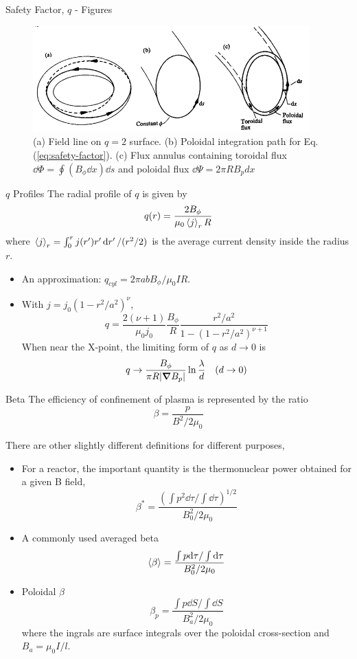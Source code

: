 \begin{frame} {Safety Factor, $q$ - Figures}
  \begin{figure}
    \centering
    \includegraphics[width=0.95\textwidth]{figures/safety-factor.png}
    \caption{(a) Field line on $q=2$ surface. (b) Poloidal integration path for Eq.(\ref{eq:safety-factor}). (c) Flux annulus containing toroidal flux $\dd{\Phi}=\oint (B_\phi\dd{x})\dd{s}$ and poloidal flux $\dd{\Psi}=2\pi RB_p dx$}
    \label{fig:safety-factor}
  \end{figure}
\end{frame}

\begin{frame} {$q$ Profiles}
  The radial profile of $q$ is given by
  \begin{equation}
    q(r) = \frac{2B_\phi}{\mu_0\expval{j}_r R}
    \label{eq:radial-q-profile}
  \end{equation}
  where $\expval{j}_r = \int_0^rj(r')r'\dd{r'}/(r^2/2)$ is the average current density inside the radius $r$.

  \begin{itemize}
    \item An approximation: $q_{cyl} = 2\pi abB_\phi/\mu_0IR$.
    \item With $j=j_0(1-r^2/a^2)^\nu$,
          \[ q = \frac{2(\nu+1)}{\mu_0j_0}\frac{B_\phi}{R}\frac{r^2/a^2}{1-(1-r^2/a^2)^{\nu+1}} \]
          When near the X-point, the limiting form of $q$ as $d\to 0$ is
          \[ q\to \frac{B_\phi}{\pi R\abs{\grad B_p}}\ln\frac{\lambda}{d} \quad (d\to 0) \]
  \end{itemize}
\end{frame}

\begin{frame} {Beta}
  The efficiency of confinement of plasma is represented by the ratio
  \[ \beta = \frac{p}{B^2/2\mu_0} \]

  There are other slightly different definitions for different purposes,
  \begin{itemize}
    \item For a reactor, the important quantity is the thermonuclear power obtained for a given B field,
          \[ \beta^* = \frac{(\int p^2\dd\tau/\int\dd\tau)^{1/2}}{B_0^2/2\mu_0} \]
    \item A commonly used averaged beta
          \[ \expval{\beta}= \frac{\int p\dd\tau / \int\dd\tau}{B_0^2/2\mu_0} \]
    \item Poloidal $\beta$
          \[ \beta_p = \frac{\int p\dd{S} / \int\dd{S}}{B_a^2/2\mu_0} \]
          where the ingrals are surface integrals over the poloidal cross-section and $B_a = \mu_0I/l$.
  \end{itemize}
\end{frame}

